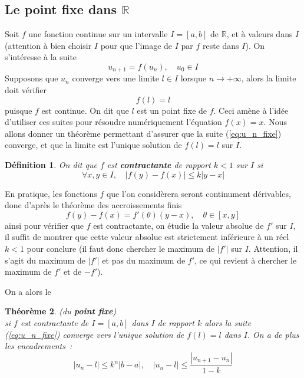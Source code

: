 \documentclass[a4paper,11pt]{article}
\newtheorem{thm}{Théorème}
\newtheorem{defn}[thm]{D\'efinition}
\newcommand{\R}{{\mathbb{R}}}
\begin{document}
\begin{giacjshere}
\subsection{Le point fixe dans $\R$} 
Soit $f$ une fonction continue sur un intervalle $I=[a,b]$ de $\R$, et 
à valeurs dans $I$ (attention à bien choisir $I$ pour que l'image
de $I$ par $f$ reste dans $I$).
On s'intéresse à la suite 
\begin{equation} \label{eq:u_n_fixe}
 u_{n+1}=f(u_n), \quad u_0 \in I 
\end{equation}
Supposons que $u_n$ converge vers une limite $l \in I$ lorsque
$n \rightarrow +\infty$, alors la limite doit vérifier
\[ f(l)=l \]
puisque $f$ est continue. On dit que $l$ est un point fixe de $f$.
Ceci amène à l'idée d'utiliser ces suites pour résoudre numériquement
l'équation $f(x)=x$. Nous allons donner un théorème permettant
d'assurer que la suite (\ref{eq:u_n_fixe}) converge, et que la limite
est l'unique solution de $f(l)=l$ sur $I$.

\begin{defn}
On dit que $f$ est {\bf contractante} de rapport $k<1$ sur $I$ si
\[ \forall x,y \in I, \quad |f(y)-f(x)| \leq k |y-x| \]
\end{defn}

En pratique, les fonctions $f$ que l'on considèrera seront continument
dérivables, donc d'après le théorème des accroissements finis
\[ f(y)-f(x)=f'(\theta) (y-x), \quad \theta \in [x,y] \]
ainsi pour vérifier que $f$ est contractante, on étudie la valeur absolue
de $f'$ sur $I$, il suffit de montrer que cette valeur absolue
est strictement inférieure à un réel $k<1$ pour conclure (il faut
donc chercher le maximum de $|f'|$ sur $I$. Attention, il s'agit du
maximum de $|f'|$ et pas du maximum de $f'$, ce qui revient à chercher
le maximum de $f'$ et de $-f'$).

On a alors le 
\begin{thm} (du {\bf point fixe})\\
si $f$ est contractante de $I=[a,b]$
dans $I$ de rapport $k$ 
alors la suite (\ref{eq:u_n_fixe}) converge vers l'unique
solution de $f(l)=l$ dans $I$. On a de plus les encadrements~:
\begin{equation}  \label{eq:u_n_l}
|u_n-l| \leq k^n |b-a|, \quad
|u_n -l | \leq \frac{|u_{n+1}-u_n|}{1-k} 
\end{equation}
\end{thm}


\end{giacjshere}
\end{document}
